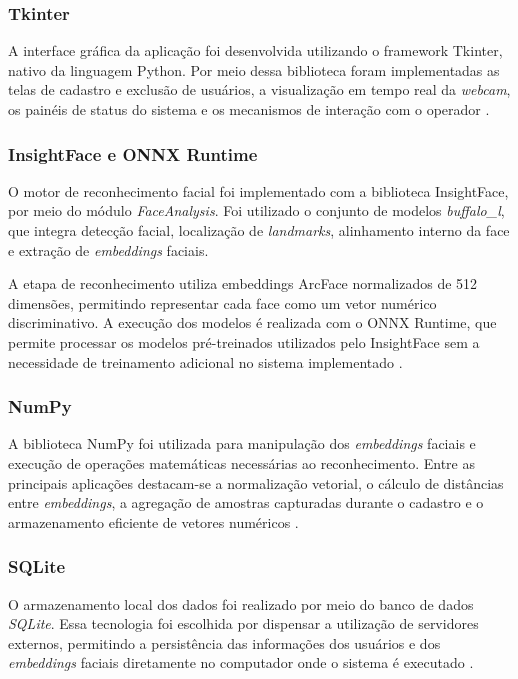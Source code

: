\subsubsection{Tkinter}

A interface gráfica da aplicação foi desenvolvida utilizando o framework Tkinter, nativo da linguagem Python. Por meio dessa biblioteca foram implementadas as telas de cadastro e exclusão de usuários, a visualização em tempo real da \textit{webcam}, os painéis de status do sistema e os mecanismos de interação com o operador \cite{tkinter_docs}.

\subsubsection{InsightFace e ONNX Runtime}

O motor de reconhecimento facial foi implementado com a biblioteca InsightFace, por meio do módulo \textit{FaceAnalysis}. Foi utilizado o conjunto de modelos \textit{buffalo\_l}, que integra detecção facial, localização de \textit{landmarks}, alinhamento interno da face e extração de \textit{embeddings} faciais.

A etapa de reconhecimento utiliza embeddings ArcFace normalizados de 512 dimensões, permitindo representar cada face como um vetor numérico discriminativo. A execução dos modelos é realizada com o ONNX Runtime, que permite processar os modelos pré-treinados utilizados pelo InsightFace sem a necessidade de treinamento adicional no sistema implementado \cite{insightface_repo, onnxruntime_docs}.

\subsubsection{NumPy}

A biblioteca NumPy foi utilizada para manipulação dos \textit{embeddings} faciais e execução de operações matemáticas necessárias ao reconhecimento. Entre as principais aplicações destacam-se a normalização vetorial, o cálculo de distâncias entre \textit{embeddings}, a agregação de amostras capturadas durante o cadastro e o armazenamento eficiente de vetores numéricos \cite{numpy_docs}.

\subsubsection{SQLite}

O armazenamento local dos dados foi realizado por meio do banco de dados \textit{SQLite}. Essa tecnologia foi escolhida por dispensar a utilização de servidores externos, permitindo a persistência das informações dos usuários e dos \textit{embeddings} faciais diretamente no computador onde o sistema é executado \cite{sqlite_docs}.

